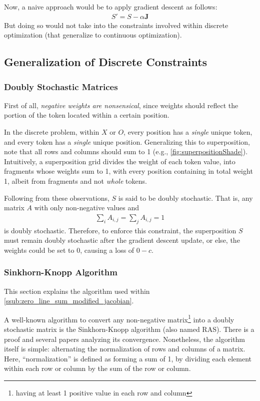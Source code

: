 Now, a naive approach would be to apply gradient descent as follows:
\begin{align}
    S'=S-\alpha\bm{J}
    \label{eq:naive_descent}
\end{align}
But doing so would not take into the constraints involved within discrete optimization (that generalize to continuous optimization).

\subsection{Generalization of Discrete Constraints}%
\label{sub:constraints}

\subsubsection{Doubly Stochastic Matrices}%
\label{ssub:doubly_stochastic_matrices}
First of all, \emph{negative weights are nonsensical}, since weights should reflect the portion of the token located within a certain position.

In the discrete problem, within $X$ or $O$, every position has a \emph{single} unique token, and every token has a \emph{single} unique position. Generalizing this to superposition, note that all rows and columns should sum to 1 (e.g., \autoref{fig:superpositionShade}). Intuitively, a superposition grid divides the weight of each token value, into fragments whose weights sum to 1, with every position containing in total weight 1, albeit from fragments and not \emph{whole} tokens.

Following from these observations, $S$ is said to be doubly stochastic. That is, any matrix $A$ with only non-negative values and
\begin{align}
    \sum_i A_{i,j}=\sum_j A_{i,j}=1
\end{align}
is doubly stochastic.\cite{weissteinDoubly} Therefore, to enforce this constraint, the superposition $S$ must remain doubly stochastic after the gradient descent update, or else, the weights could be set to 0, causing a loss of  $0-c$.

\subsubsection{Sinkhorn-Knopp Algorithm}%
\label{ssub:sinkhorn_knopp_algorithm}
This section explains the algorithm used within \autoref{ssub:zero_line_sum_modified_jacobian}.

A well-known algorithm to convert any non-negative matrix\footnote{\label{non-negative-caveat}having at least 1 positive value in each row and column} into a doubly stochastic matrix is the Sinkhorn-Knopp algorithm (also named RAS).\cite{sinkhorn1967concerning} There is a proof\cite{borobia1998matrix} and several papers analyzing its convergence.\cite{chakrabarty2018better,knight2008sinkhorn} Nonetheless, the algorithm itself is simple: alternating the normalization of rows and columns of a matrix. Here, ``normalization'' is defined as forming a sum of 1, by dividing each element within each row or column by the sum of the row or column.

